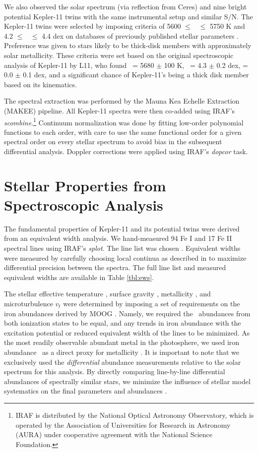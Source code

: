 \documentclass[oneside]{emulateapj}
\begin{document}
We also observed the solar spectrum (via reflection from Ceres) and nine bright potential Kepler-11 twins with the same instrumental setup and similar S/N. The Kepler-11 twins were selected by imposing criteria of 5600 $\leq$ \teff\ $\leq$ 5750 K and 4.2 $\leq$ \logg\ $\leq$ 4.4 dex on databases of previously published stellar parameters \citep{Adibekyan2012, Bensby2014}. Preference was given to stars likely to be thick-disk members with approximately solar metallicity. These criteria were set based on the original spectroscopic analysis of Kepler-11 by L11, who found \teff\ = 5680 $\pm$ 100 K, \logg\ = 4.3 $\pm$ 0.2 dex, \feh = 0.0 $\pm$ 0.1 dex, and a significant chance of Kepler-11's being a thick disk member based on its kinematics.

The spectral extraction was performed by the Mauna Kea Echelle Extraction (MAKEE) pipeline. All Kepler-11 spectra were then co-added using IRAF's \textit{scombine}.\footnote{IRAF is distributed by the National Optical Astronomy Observatory, which is operated by the Association of Universities for Research in Astronomy (AURA) under cooperative agreement with the National Science Foundation.} Continuum normalization was done by fitting low-order polynomial functions to each order, with care to use the same functional order for a given spectral order on every stellar spectrum to avoid bias in the subsequent differential analysis. Doppler corrections were applied using IRAF's \textit{dopcor} task.


\section{Stellar Properties from Spectroscopic Analysis}
\label{s:characterization}

The fundamental properties of Kepler-11 and its potential twins were derived from an equivalent width analysis. We hand-measured 94 Fe I and 17 Fe II spectral lines using IRAF's \textit{splot}. The line list was chosen . Equivalent widths were measured by carefully choosing local continua as described in \citet{Bedell2014} to maximize differential precision between the spectra. The full line list and measured equivalent widths are available in Table \ref{tbl:ews}.

The stellar effective temperature \teff, surface gravity \logg, metallicity \mh, and microturbulence $v_t$ were determined by imposing a set of requirements on the iron abundances derived by MOOG \citep{Sneden1973}. Namely, we required the \feh\ abundances from both ionization states to be equal, and any trends in iron abundance with the excitation potential or reduced equivalent width of the lines to be minimized. As the most readily observable abundant metal in the photosphere, we used iron abundance \feh\ as a direct proxy for metallicity \mh. It is important to note that we exclusively used the \textit{differential} abundance measurements relative to the solar spectrum for this analysis. By directly comparing line-by-line differential abundances of spectrally similar stars, we minimize the influence of stellar model systematics on the final parameters and abundances \citep[see e.g.][]{Ramirez2014}. 
\end{document}
